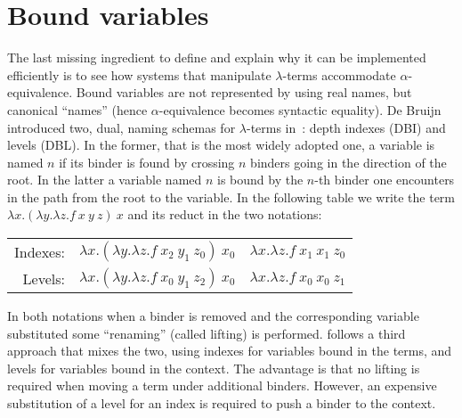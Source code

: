 \documentclass{llncs}
\begin{document}
\section{Bound variables}
\label{sec:dbl}

The last missing ingredient to define \rff{} and explain why it can be
implemented efficiently is to see how systems that manipulate $\lambda$-terms
accommodate
$\alpha$-equivalence. Bound variables are not represented by using
real names, but canonical ``names'' (hence $\alpha$-equivalence becomes syntactic equality).
De Bruijn introduced two, dual, naming schemas for $\lambda$-terms in~\cite{debruijnlevel}:
depth indexes (DBI) and levels
(DBL). In the former, that is the most widely adopted one, a variable is named $n$ if its binder is found by
crossing $n$ binders going in the direction of the root. In the latter a
variable named $n$ is bound by the $n$-th binder one encounters in the path
from the root to the variable.
In the following table we write the term $\lambda x.(\lambda y.\lambda z.f~x~y~z)~x$ and its reduct in the two notations:
\vspace{-0.5em}
\begin{center}
\begin{tabular}{r@{~~}c@{~$\to_\beta$~}c}
Indexes: & $\lambda x.(\lambda y.\lambda z.f~x_2~y_1~z_0)~x_0$ &
$\lambda x.\lambda z.f~x_1~x_1~z_0$ \\
Levels: & $\lambda x.(\lambda y.\lambda z.f~x_0~y_1~z_2)~x_0$ &
$\lambda x.\lambda z.f~x_0~x_0~z_1$ \\
\end{tabular}
\end{center}
\vspace{-0.5em}
In both notations when a binder is removed and the corresponding variable
substituted some ``renaming'' (called lifting) is performed.
\tedius{} follows
a third approach that mixes the two, using indexes for variables bound in
the terms, and levels for variables bound in the context. The advantage
is that no lifting is required when moving a term under additional binders.
However, an expensive substitution of a level for an index is
required to push a binder to the context.
\end{document}
